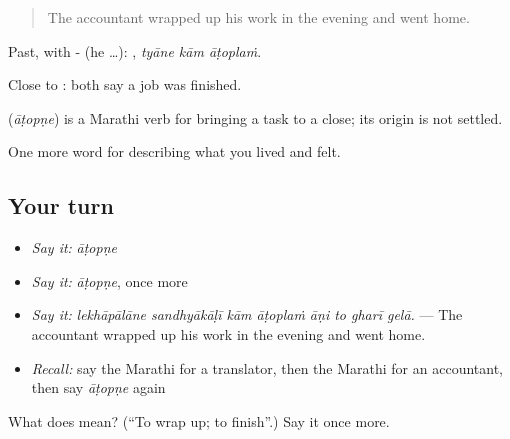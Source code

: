 \begin{quote}
The accountant wrapped up his work in the evening and went home.
\end{quote}

Past, with - (he …):   , \emph{tyāne kām āṭoplaṁ}.

Close to : both say a job was finished.

\begin{cousinweb}
\textbf{} (\emph{āṭopṇe}) is a Marathi verb for bringing a task to a close; its origin is not settled.
\end{cousinweb}

\begin{grammarlens}[title={What you've built}]
One more word for describing what you lived and felt.
\end{grammarlens}

\subsection*{Your turn}
\begin{itemize}
\raggedright
  \item \emph{Say it:} \emph{āṭopṇe}
  \item \emph{Say it:} \emph{āṭopṇe}, once more
  \item \emph{Say it:} \emph{lekhāpālāne sandhyākāḷī kām āṭoplaṁ āṇi to gharī gelā.} — The accountant wrapped up his work in the evening and went home.
  \item \emph{Recall:} say the Marathi for a translator, then the Marathi for an accountant, then say \emph{āṭopṇe} again
\end{itemize}

\begin{tcolorbox}[breakable,colback=teal!4,colframe=teal!35!black,title={Before you move on}]
What does  mean? (\textquotedblleft{}To wrap up; to finish\textquotedblright{}.) Say it once more.
\end{tcolorbox}
